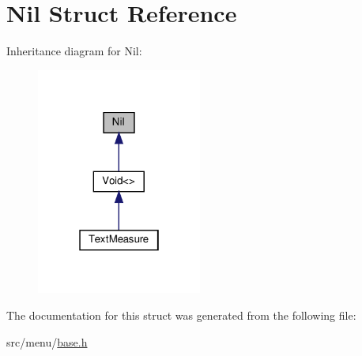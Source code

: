 \hypertarget{structNil}{}\section{Nil Struct Reference}
\label{structNil}


Inheritance diagram for Nil\+:\nopagebreak
\begin{figure}[H]
\begin{center}
\leavevmode
\includegraphics[width=154pt]{structNil__inherit__graph}
\end{center}
\end{figure}


The documentation for this struct was generated from the following file\+:\begin{DoxyCompactItemize}
\item 
src/menu/\hyperlink{base_8h}{base.\+h}\end{DoxyCompactItemize}
